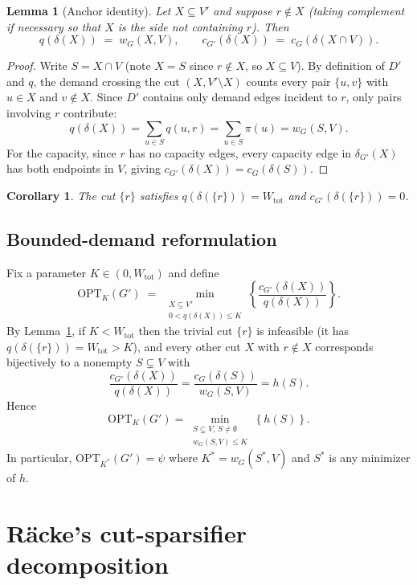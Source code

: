 \documentclass[11pt]{article}
\newtheorem{lemma}[theorem]{Lemma}
\newtheorem{corollary}[theorem]{Corollary}
\newcommand{\cut}{\delta}
\newcommand{\OPT}{\mathrm{OPT}}
\newcommand{\brc}[1]{\mathopen{}\left\{ #1 \right\}}
\begin{document}
\begin{lemma}[Anchor identity]\label{lem:anchor}
  Let $X\subseteq V'$ and suppose $r\notin X$ (taking complement if necessary so
  that $X$ is the side not containing $r$). Then
  \[
    q(\cut(X)) \;=\; w_G(X,V),
    \qquad
    c_{G'}(\cut(X)) \;=\; c_G(\cut(X\cap V)).
  \]
\end{lemma}

\begin{proof}
  Write $S=X\cap V$ (note $X=S$ since $r\notin X$, so $X\subseteq V$).
  By definition of $D'$ and $q$, the demand crossing the cut $(X,V'\setminus X)$ counts
  every pair $\{u,v\}$ with $u\in X$ and $v\notin X$.
  Since $D'$ contains only demand edges incident to $r$, only pairs involving $r$ contribute:
  \[
    q(\cut(X))
    =\sum_{u\in S} q(u,r)
    =\sum_{u\in S}\pi(u)
    =w_G(S,V).
  \]
  For the capacity, since $r$ has no capacity edges, every capacity edge in
  $\cut_{G'}(X)$ has both endpoints in $V$, giving
  $c_{G'}(\cut(X))=c_G(\cut(S))$.
\end{proof}

\begin{corollary}\label{cor:trivial-cut}
  The cut $\{r\}$ satisfies $q(\cut(\{r\}))=W_{\mathrm{tot}}$
  and $c_{G'}(\cut(\{r\}))=0$.
\end{corollary}

\subsection{Bounded-demand reformulation}

Fix a parameter $K\in(0,W_{\mathrm{tot}})$ and define
\[
  \OPT_K(G')
  \;=\;
  \min_{\substack{X\subseteq V'\\ 0<q(\cut(X))\le K}}
  \brc{\frac{c_{G'}(\cut(X))}{q(\cut(X))}}.
\]
By Lemma~\ref{lem:anchor}, if $K<W_{\mathrm{tot}}$ then the trivial cut $\{r\}$
is infeasible (it has $q(\cut(\{r\}))=W_{\mathrm{tot}}>K$), and every other cut
$X$ with $r\notin X$ corresponds bijectively to a nonempty $S\subsetneq V$ with
\[
  \frac{c_{G'}(\cut(X))}{q(\cut(X))}
  =
  \frac{c_G(\cut(S))}{w_G(S,V)}
  = h(S).
\]
Hence
\[
  \OPT_K(G') = \min_{\substack{S\subsetneq V,\, S\neq\emptyset\\ w_G(S,V)\le K}}
               \brc{h(S)}.
\]
In particular, $\OPT_{K^*}(G')=\psi$ where $K^*=w_G(S^*,V)$ and $S^*$ is any
minimizer of $h$.

\section{Räcke's cut-sparsifier decomposition}
\end{document}
